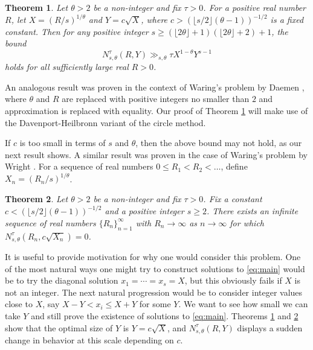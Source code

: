 \documentclass[11pt,reqno]{amsart}
\numberwithin{equation}{section}
\newtheorem{theorem}{Theorem}
\begin{document}
\begin{theorem} \label{thm:pos}
Let $\theta > 2$ be a non-integer and fix $\tau > 0$. For a positive real number $R$, let $X = (R/s)^{1/\theta}$ and $Y=c\sqrt{X}$, where $c >(\lfloor s/2 \rfloor (\theta-1))^{-1/2}$ is a fixed constant. Then for any positive integer $s \geq (\lfloor2\theta\rfloor+1)(\lfloor 2\theta \rfloor+2)+1$, the bound 
\[ N_{s, \theta}^{\tau}(R,Y) \gg_{s,\theta} \tau X^{1-\theta}Y^{s-1} \]
holds for all sufficiently large real $R > 0 $. 
\end{theorem}

An analogous result was proven in the context of Waring's problem by Daemen \cite{DaemenAA1}, where $\theta$ and $R$ are replaced with positive integers no smaller than $2$ and approximation is replaced with equality. Our proof of Theorem \ref{thm:pos} will make use of the Davenport-Heilbronn variant of the circle method. 

If $c$ is too small in terms of $s$ and $\theta$, then the above bound may not hold, as our next result shows. A similar result was proven in the case of Waring's problem by Wright \cite{Wright1}. For a sequence of real numbers $0 \leq R_1 < R_2< \ldots$, define $X_n = (R_n/s)^{1/\theta}$. 

\begin{theorem} \label{thm:neg} 
Let $\theta > 2$ be a non-integer and fix $\tau > 0$. Fix a constant $c < (\lfloor s/2 \rfloor(\theta-1))^{-1/2}$ and a positive integer $s \geq 2$. There exists an infinite sequence of real numbers $\{R_n\}_{n=1}^{\infty}$ with $R_n \to \infty$ as $n \to \infty$ for which  $N_{s,\theta}^{\tau}(R_n, c\sqrt{X_n}) = 0$. 
\end{theorem}

It is useful to provide motivation for why one would consider this problem. One of the most natural ways one might try to construct solutions to \eqref{eq:main} would be to try the diagonal solution $x_1 = \cdots = x_s = X$, but this obviously fails if $X$ is not an integer. The next natural progression would be to consider integer values close to $X$, say $X-Y < x_i \leq X+Y$ for some $Y$. We want to see how small we can take $Y$ and still prove the existence of solutions to \eqref{eq:main}. 
Theorems \ref{thm:pos} and \ref{thm:neg} show that the optimal size of $Y$ is $Y = c \sqrt{X}$, and $N_{s,\theta}^{\tau}(R,Y)$ displays a sudden change in behavior at this scale depending on $c$. 
\end{document}
